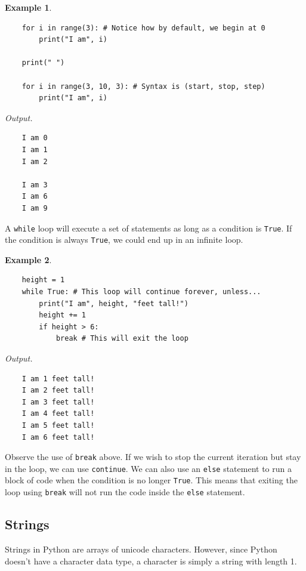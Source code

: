 \documentclass[11pt]{scrartcl}
\theoremstyle{definition}
\newtheorem*{example}{Example}
\begin{document}
\begin{example}
    \
\begin{verbatim}
    for i in range(3): # Notice how by default, we begin at 0
        print("I am", i)

    print(" ")

    for i in range(3, 10, 3): # Syntax is (start, stop, step)
        print("I am", i)
\end{verbatim}
    \textit{Output.}
\begin{verbatim}
    I am 0
    I am 1
    I am 2
     
    I am 3
    I am 6
    I am 9
\end{verbatim}
\end{example}

A \texttt{while} loop will execute a set of statements as long as a condition is 
\texttt{True}. If the condition is always \texttt{True}, we could end up in an 
infinite loop. 

\begin{example}
    \
\begin{verbatim}
    height = 1
    while True: # This loop will continue forever, unless...
        print("I am", height, "feet tall!")
        height += 1
        if height > 6:
            break # This will exit the loop
\end{verbatim}
    \textit{Output.}
\begin{verbatim}
    I am 1 feet tall!
    I am 2 feet tall!
    I am 3 feet tall!
    I am 4 feet tall!
    I am 5 feet tall!
    I am 6 feet tall!
\end{verbatim}
\end{example}

Observe the use of \texttt{break} above. If we wish to stop the current iteration but stay in the 
loop, we can use \texttt{continue}. We can also use an \texttt{else} statement to run 
a block of code when the condition is no longer \texttt{True}. This means that exiting the loop 
using \texttt{break} will not run the code inside the \texttt{else} statement.

\subsection{Strings}

Strings in Python are arrays of unicode characters. However, since Python doesn't have a character data type, a 
character is simply a string with length 1. \\
\end{document}
